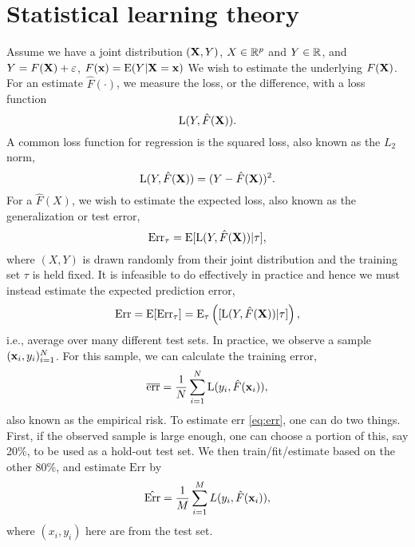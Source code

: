 \chapter{Statistical learning theory}\label{ch:learning-theory}
Assume we have a joint distribution $(\mathbf{X}, Y)$, $X\in\mathbb{R}^p$ and $Y\in\mathbb{R}$, and $Y=F(\mathbf{X})+\varepsilon$, $F(\mathbf{x})=\operatorname{E}(Y|\mathbf{X}=\mathbf{x})$ We wish to estimate the underlying $F(\mathbf{X})$. For an estimate $\hat{F}(\cdot)$, we measure the loss, or the difference, with a loss function
\begin{equation}
    \operatorname{L}(Y, \hat{F}(\mathbf{X})).
\end{equation}
A common loss function for regression is the squared loss, also known as the $L_2$ norm,
\begin{equation}
    \operatorname{L}(Y, \hat{F}(\mathbf{X}))=(Y-\hat{F}(\mathbf{X}))^2.
\end{equation}
For a $\hat{F}(X)$, we wish to estimate the expected loss, also known as the generalization or test error,
\begin{equation}
    \text{Err}_{\tau}=\operatorname{E}[\operatorname{L}(Y,\hat{F}(\mathbf{X}))|\tau],
\end{equation}
where $(X,Y)$ is drawn randomly from their joint distribution and the training set $\tau$ is held fixed. It is infeasible to do effectively in practice  and hence we must instead estimate the expected prediction error,
\begin{equation}\label{eq:err}
    \text{Err}=\operatorname{E}[\text{Err}_\tau]=\operatorname{E}_\tau\left([\operatorname{L}(Y,\hat{F}(\mathbf{X}))|\tau]\right),
\end{equation}
i.e., average over many different test sets.
In practice, we observe a sample $(\mathbf{x}_i,y_i)_{i=1}^N$. For this sample, we can calculate the training error,
\begin{equation}\label{eq:empirical-risk}
    \overline{\text{err}}=\frac{1}{N}\sum_{i=1}^N\operatorname{L}(y_i, \hat{F}(\mathbf{x}_i)),
\end{equation}
also known as the empirical risk. To estimate $\text{err}$ \eqref{eq:err}, one can do two things. First, if the observed sample is large enough, one can choose a portion of this, say 20\%, to be used as a hold-out test set. We then train/fit/estimate based on the other 80\%, and estimate $\text{Err}$ by
\begin{equation}
    \hat{\text{Err}}=\frac{1}{M}\sum_{i=1}^ML(y_i,\hat{F}(\mathbf{x}_i)),
\end{equation}
where $(x_i,y_i)$ here are from the test set.